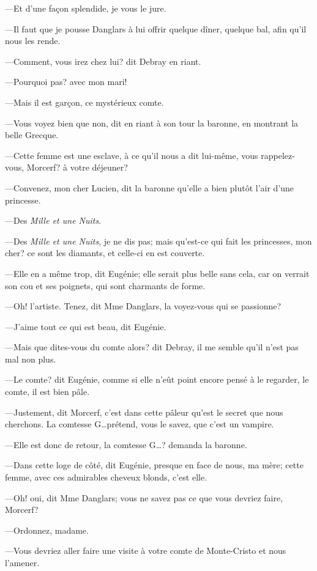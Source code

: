 —Et d'une façon splendide, je vous le jure. 

—Il faut que je pousse Danglars à lui offrir quelque dîner, quelque bal, afin qu'il nous les rende. 

—Comment, vous irez chez lui? dit Debray en riant. 

—Pourquoi pas? avec mon mari! 

—Mais il est garçon, ce mystérieux comte. 

—Vous voyez bien que non, dit en riant à son tour la baronne, en montrant la belle Grecque. 

—Cette femme est une esclave, à ce qu'il nous a dit lui-même, vous rappelez-vous, Morcerf? à votre déjeuner? 

—Convenez, mon cher Lucien, dit la baronne qu'elle a bien plutôt l'air d'une princesse. 

—Des \textit{Mille et une Nuits}. 

—Des \textit{Mille et une Nuits}, je ne dis pas; mais qu'est-ce qui fait les princesses, mon cher? ce sont les diamants, et celle-ci en est couverte. 

—Elle en a même trop, dit Eugénie; elle serait plus belle sans cela, car on verrait son cou et ses poignets, qui sont charmants de forme. 

—Oh! l'artiste. Tenez, dit Mme Danglars, la voyez-vous qui se passionne? 

—J'aime tout ce qui est beau, dit Eugénie. 

—Mais que dites-vous du comte alors? dit Debray, il me semble qu'il n'est pas mal non plus. 

—Le comte? dit Eugénie, comme si elle n'eût point encore pensé à le regarder, le comte, il est bien pâle. 

—Justement, dit Morcerf, c'est dans cette pâleur qu'est le secret que nous cherchons. La comtesse G\dots prétend, vous le savez, que c'est un vampire. 

—Elle est donc de retour, la comtesse G\dots? demanda la baronne. 

—Dans cette loge de côté, dit Eugénie, presque en face de nous, ma mère; cette femme, avec ces admirables cheveux blonds, c'est elle. 

—Oh! oui, dit Mme Danglars; vous ne savez pas ce que vous devriez faire, Morcerf? 

—Ordonnez, madame. 

—Vous devriez aller faire une visite à votre comte de Monte-Cristo et nous l'amener. 

